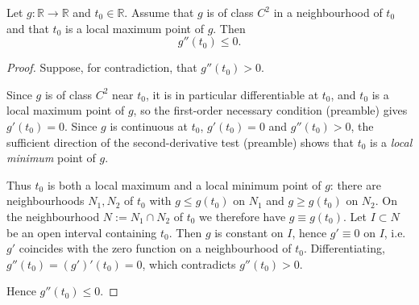 \begin{lemma}
Let $g:\mathbb{R}\to\mathbb{R}$ and $t_0\in\mathbb{R}$. Assume that $g$ is of class $C^2$ in a
neighbourhood of $t_0$ and that $t_0$ is a local maximum point of $g$. Then
$$g''(t_0)\leq0 .$$
\end{lemma}
\begin{proof}
Suppose, for contradiction, that $g''(t_0)>0$.

Since $g$ is of class $C^2$ near $t_0$, it is in particular differentiable at $t_0$, and $t_0$ is a
local maximum point of $g$, so the first-order necessary condition (preamble) gives $g'(t_0)=0$.
Since $g$ is continuous at $t_0$, $g'(t_0)=0$ and $g''(t_0)>0$, the sufficient direction of the
second-derivative test (preamble) shows that $t_0$ is a \emph{local minimum} point of $g$.

Thus $t_0$ is both a local maximum and a local minimum point of $g$: there are neighbourhoods
$N_1,N_2$ of $t_0$ with $g\leq g(t_0)$ on $N_1$ and $g\geq g(t_0)$ on $N_2$. On the neighbourhood
$N:=N_1\cap N_2$ of $t_0$ we therefore have $g\equiv g(t_0)$. Let $I\subset N$ be an open interval
containing $t_0$. Then $g$ is constant on $I$, hence $g'\equiv0$ on $I$, i.e.\ $g'$ coincides with
the zero function on a neighbourhood of $t_0$. Differentiating, $g''(t_0)=(g')'(t_0)=0$, which
contradicts $g''(t_0)>0$.

Hence $g''(t_0)\leq0$.
\end{proof}
